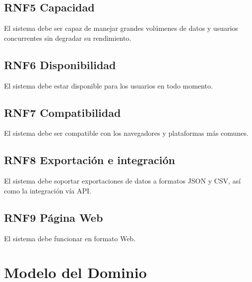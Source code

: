\documentclass[12pt.a4paper]{article}
\begin{document}
\subsection*{RNF5 Capacidad}
El sistema debe ser capaz de manejar grandes volúmenes de datos y usuarios concurrentes sin degradar su rendimiento.

\subsection*{RNF6 Disponibilidad}
El sistema debe estar disponible para los usuarios en todo momento.

\subsection*{RNF7 Compatibilidad}
El sistema debe ser compatible con los navegadores y plataformas más comunes.

\subsection*{RNF8 Exportación e integración}
El sistema debe soportar exportaciones de datos a formatos JSON y CSV, así como la integración vía API.

\subsection*{RNF9 Página Web}
El sistema debe funcionar en formato Web.

\section{Modelo del Dominio}
\lipsum[22]
\end{document}
